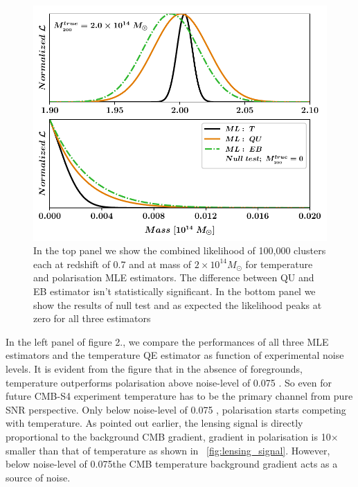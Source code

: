  \begin{figure}[t]
\includegraphics[width=\linewidth, keepaspectratio]{figs/fig0-eps-converted-to.pdf}
 \caption{In the top panel we show the combined likelihood of 100,000 clusters each at redshift of 0.7 and at mass of $2\times 10^{14} M_{\odot}$ for temperature and polarisation MLE estimators. The difference between QU and EB estimator isn't statistically significant. In the bottom panel we show the results of null test and as expected the likelihood peaks at zero for all three estimators}
 \end{figure}
 
 In the left panel of figure 2., we compare the performances of all three MLE estimators and the temperature QE estimator as function of experimental noise levels. 
 It is evident from the figure that in the absence of foregrounds, temperature outperforms polarisation above noise-level of 0.075 \ukam.
 So even for future CMB-S4 experiment temperature has to be the primary channel from pure SNR perspective.
 Only below noise-level of  0.075 \ukam, polarisation starts competing with temperature.
 As pointed out earlier, the lensing signal is directly proportional to the background CMB gradient, gradient in polarisation is 10$\times$ smaller than that of temperature as shown in ~\ref{fig:lensing_signal}. However, below noise-level of 0.075\ukam the CMB temperature background gradient acts as a source of noise. 
 
